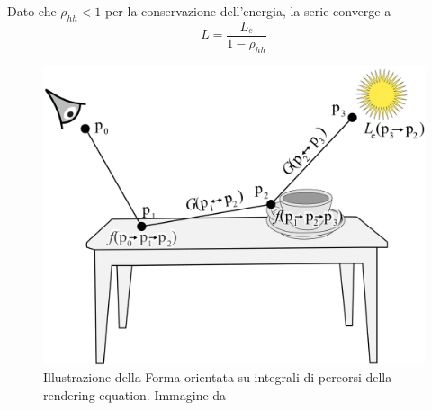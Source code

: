Dato che $\rho_{hh}<1$ per la conservazione dell'energia, la serie converge a 
\begin{equation}
	L=\frac{L_e}{1-\rho_{hh}}
\end{equation}
\begin{figure}[tb]
	\centering
	\includegraphics[width=0.8\linewidth]{../assets/chapter8_light_transport_equation.png}
	\caption{Illustrazione della Forma orientata su integrali di percorsi della rendering equation. Immagine da \cite{pharr}}
	\label{chapter8:LTE:pathFig}
\end{figure}
